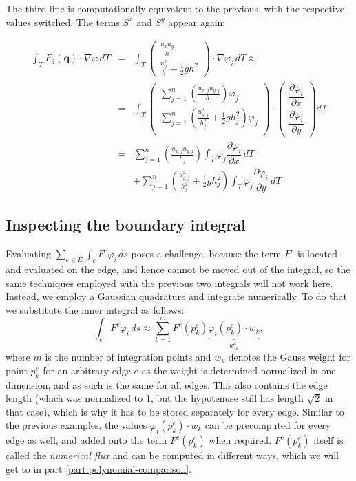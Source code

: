 \documentclass{article}
\newcommand{\pd}[2]{\dfrac{\partial #1}{\partial #2}}
\renewcommand{\phi}{\varphi}
\begin{document}
The third line is computationally equivalent to the previous, with the respective values switched. The terms $S^x$ and $S^y$ appear again:

\begin{eqnarray*}
  \int_T F_3\left(\mathbf{q}\right) \cdot \nabla \phi \, dT & = &
  \int_T
  \begin{pmatrix}
    \frac{u_x u_y}{h} \\ \frac{u_y^2}{h} + \frac{1}{2} g h^2
  \end{pmatrix}
  \cdot \nabla \phi_i \, dT \approx \\
  & = & \int_T
  \begin{pmatrix}
    \sum_{j=1}^n \left(\frac{u_{x,j} u_{y,j}}{h_j}\right) \phi_j \\
    \sum_{j=1}^n \left(\frac{u_{y,j}^2}{h_j^2} + \frac{1}{2} g h_j^2\right) \phi_j \\
  \end{pmatrix}
  \cdot
  \begin{pmatrix}
    \pd{\phi_i}{x} \\
    \pd{\phi_i}{y}
  \end{pmatrix} dT \\
  & = & \sum_{j=1}^n \left(\frac{u_{x,j} u_{y,j}}{h_j}\right) \int_T \phi_j \pd{\phi_i}{x} \, dT \\
  & {} & + \sum_{j=1}^n \left(\frac{u_{y,j}^2}{h_j^2} + \frac{1}{2} g h_j^2\right) \int_T \phi_j \pd{\phi_i}{y} \, dT
\end{eqnarray*}

\subsection{Inspecting the boundary integral}
\label{sec:boundary-integral}

Evaluating $\sum_{e \in E} \int_{e} F^e \phi_i \, ds$ poses a challenge, because the term $F^e$ is located and evaluated on the edge, and hence cannot be moved out of the integral, so the same techniques employed with the previous two integrals will not work here. Instead, we employ a Gaussian quadrature and integrate numerically. To do that we substitute the inner integral as follows:
\begin{equation}
  \int_{e} F^e \phi_i \, ds \approx \sum_{k=1}^{m} F^e\left(p_k^e\right) \underbrace{\phi_i\left(p_k^e\right) \cdot w_k}_{w_{ik}^e},
\end{equation}
where $m$ is the number of integration points and $w_k$ denotes the Gauss weight for point $p_k^e$ for an arbitrary edge $e$ as the weight is determined normalized in one dimension, and as such is the same for all edges. This also contains the edge length (which was normalized to 1, but the hypotenuse still has length $\sqrt{2}$ in that case), which is why it has to be stored separately for every edge. Similar to the previous examples, the values $\phi_i\left(p_k^e\right) \cdot w_k$ can be precomputed for every edge as well, and added onto the term $F^e\left(p_k^e\right)$ when required. $F^e\left(p_k^e\right)$ itself is called the \emph{numerical flux} and can be computed in different ways, which we will get to in part \ref{part:polynomial-comparison}.
\end{document}
